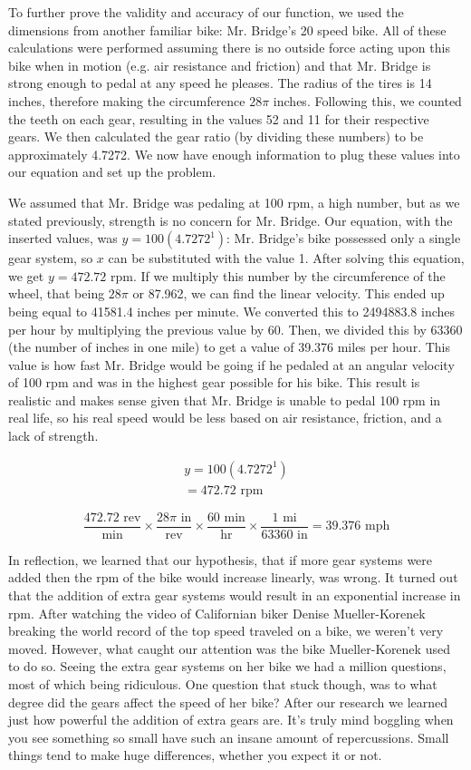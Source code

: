 \documentclass{article}
\begin{document}
To further prove the validity and accuracy of our function, we used the dimensions from another familiar bike: Mr. Bridge’s 20 speed bike. All of these calculations were performed  assuming there is no outside force acting upon this bike when in motion (e.g. air resistance and  friction) and that Mr. Bridge is strong enough to pedal at any speed he pleases. The radius of the tires is 14 inches, therefore making the circumference $28\pi$ inches. Following this, we counted the teeth on each gear, resulting in the values 52 and 11 for their respective gears. We then calculated  the gear ratio (by dividing these numbers) to be approximately 4.7272. We now have enough  information to plug these values into our equation and set up the problem.  

We assumed that Mr. Bridge was pedaling at 100 rpm, a high number,  but as we stated previously, strength is no concern for Mr. Bridge. Our equation, with the inserted values, was $y=100(4.7272^{1})$: Mr. Bridge’s bike possessed only a single gear system,  so $x$ can be substituted with the value 1. After solving this equation, we get $y=472.72$ rpm.  If we multiply this number by the circumference of the wheel, that being $28\pi$ or 87.962, we can  find the linear velocity. This ended up being equal to 41581.4 inches per minute. We converted this to 2494883.8 inches per hour by multiplying the previous value by 60. Then, we divided this by 63360 (the number of inches in one mile) to get a value of 39.376 miles per hour.  This value is how fast Mr. Bridge would be going if he pedaled at an angular velocity of 100 rpm and was in the highest gear possible for his bike. This result is realistic and makes sense given that Mr. Bridge is unable to pedal 100 rpm in real life, so his real speed would be less based on air resistance, friction, and a lack of strength.  

\begin{align*}
y=100(4.7272^{1}) \\
= 472.72 \text{ rpm} 
\end{align*}

$$
\frac{472.72 \text{ rev}}{\text{min}} \times \frac{28\pi \text{ in}}{\text{rev}} \times \frac{60 \text{ min}}{\text{hr}} \times \frac{1 \text{ mi}}{63360 \text{ in}} = 39.376 \text{ mph}
$$

In reflection, we learned that our hypothesis, that if more gear systems were added then  the rpm of the bike would increase linearly, was wrong. It turned out that the addition of extra gear systems would result in an exponential increase in rpm. After watching the video of Californian biker Denise Mueller-Korenek breaking the world record of the top speed traveled on  a bike, we weren’t very moved. However, what caught our attention was the bike Mueller-Korenek used to do so. Seeing the extra gear systems on her bike we had a million  questions, most of which being ridiculous. One question that stuck though, was to what degree did the gears affect the speed of her bike? After our research we learned just how powerful the addition of extra gears are. It’s truly mind boggling when you see something so small have such  an insane amount of repercussions. Small things tend to make huge differences, whether you  expect it or not. 
\end{document}
